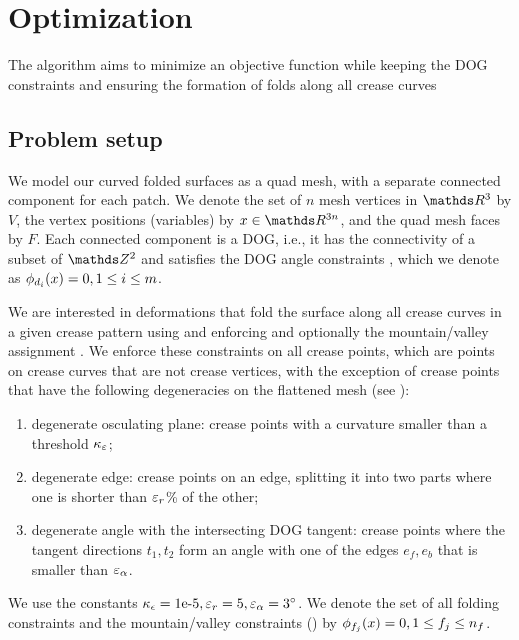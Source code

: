 
\section{Optimization} \label{sec:implementation}
 The algorithm aims to minimize an objective function while keeping the DOG constraints and ensuring the formation of folds along all crease curves  

\subsection{Problem setup}
We model our curved folded surfaces as a quad mesh, with a separate connected component for each patch. We denote the set of $n$ mesh vertices in $\R^3$ by $V$, the vertex positions (variables) by $\x \in \R^{3n}$, and the quad mesh faces by $F$. Each connected component is a DOG, i.e., it has the connectivity of a subset of $\Z^2$ and satisfies the DOG angle constraints \cite{rabi18}, which we denote as $\phi_{d_i}(x) = 0, 1 \leq i \leq m$.

We are interested in deformations that fold the surface along all crease curves in a given crease pattern using  and enforcing  and optionally the mountain/valley assignment . We enforce these constraints on all crease points, which are points on crease curves that are not crease vertices, with the exception of crease points that have the following degeneracies on the flattened mesh (see ):
\begin{enumerate}
	\item degenerate osculating plane: crease points with a curvature smaller than a threshold $\kappa_\varepsilon$; \label{item:deg_osc}
	\item degenerate edge: crease points on an edge, splitting it into two parts where one is shorter than $\varepsilon_{r}$\% of the other; \label{item:deg_edge}
	\item degenerate angle with the intersecting DOG tangent: crease points where the tangent directions $t_1,t_2$ form an angle with one of the edges $e_f,e_b$ that is smaller than $\varepsilon_\alpha$. \label{item:deg_tan_angle}
\end{enumerate}
We use the constants $\kappa_\epsilon=\text{1e-5}, \varepsilon_r=5, \varepsilon_\alpha=3^{\circ}$. We denote the set of all folding constraints and the mountain/valley constraints () by $\phi_{f_j}(x) = 0, 1 \leq f_j \leq n_f$.

